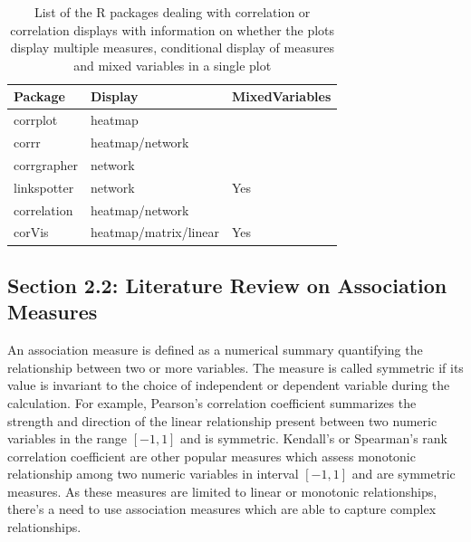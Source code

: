 \begin{Schunk}
\begin{table}

\caption{\label{tab:corrdisplay-packages}List of the R packages dealing with correlation or correlation displays with information on whether the plots display multiple measures, conditional display of measures and mixed variables in a single plot}
\centering
\begin{tabular}[t]{lll}
\toprule
Package & Display & MixedVariables\\
\midrule
corrplot & heatmap & \\
corrr & heatmap/network & \\
corrgrapher & network & \\
linkspotter & network & Yes\\
correlation & heatmap/network & \\
\addlinespace
corVis & heatmap/matrix/linear & Yes\\
\bottomrule
\end{tabular}
\end{table}

\end{Schunk}

\hypertarget{section-2.2-literature-review-on-association-measures}{%
\subsection{Section 2.2: Literature Review on Association
Measures}\label{section-2.2-literature-review-on-association-measures}}

An association measure is defined as a numerical summary quantifying the
relationship between two or more variables. The measure is called
symmetric if its value is invariant to the choice of independent or
dependent variable during the calculation. For example, Pearson's
correlation coefficient summarizes the strength and direction of the
linear relationship present between two numeric variables in the range
\([-1,1]\) and is symmetric. Kendall's or Spearman's rank correlation
coefficient are other popular measures which assess monotonic
relationship among two numeric variables in interval \([-1,1]\) and are
symmetric measures. As these measures are limited to linear or monotonic
relationships, there's a need to use association measures which are able
to capture complex relationships.

